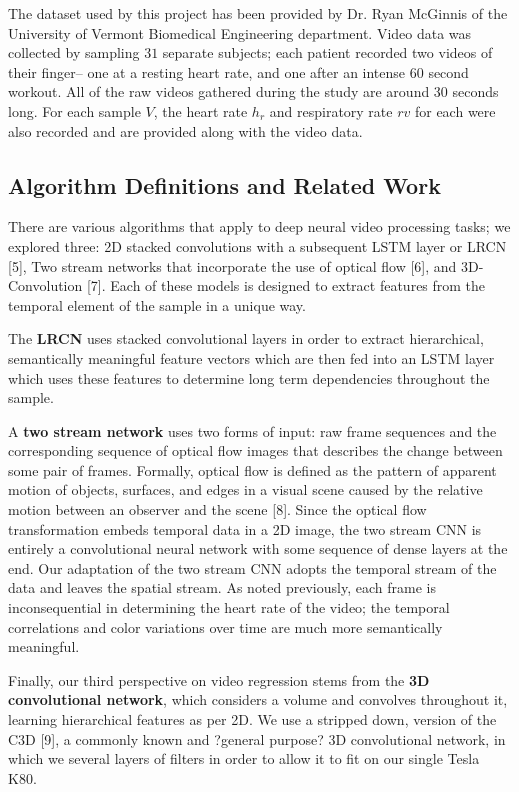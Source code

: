 \documentclass{article}
\begin{document}
\noindent The dataset used by this project has been provided by Dr. Ryan McGinnis of the University of Vermont Biomedical Engineering department. Video data was collected by sampling $31$ separate subjects; each patient recorded two videos of their finger-- one at a resting heart rate, and one after an intense $60$ second workout. All of the raw videos gathered during the study are around 30 seconds long. For each sample $V$, the heart rate $h_{r}$ and respiratory rate $r{v}$ for each were also recorded and are provided along with the video data.

\subsection[2.2]{Algorithm Definitions and Related Work}
\noindent There are various algorithms that apply to deep neural video processing tasks; we explored three: 2D stacked convolutions with a subsequent LSTM layer or LRCN [5], Two stream networks that incorporate the use of optical flow [6], and 3D-Convolution [7]. Each of these models is designed to extract features from the temporal element of the sample in a unique way.

\noindent The \textbf{LRCN} uses stacked convolutional layers in order to extract hierarchical, semantically meaningful feature vectors which are then fed into an LSTM layer which uses these features to determine long term dependencies throughout the sample. 

\noindent A \textbf{two stream network} uses two forms of input: raw frame sequences and the corresponding sequence of optical flow images that describes the change between some pair of frames. Formally, optical flow is defined as the pattern of apparent motion of objects, surfaces, and edges in a visual scene caused by the relative motion between an observer and the scene [8]. Since the optical flow transformation embeds temporal data in a 2D image, the two stream CNN is entirely a convolutional neural network with some sequence of dense layers at the end. Our adaptation of the two stream CNN adopts the temporal stream of the data and leaves the spatial stream. As noted previously, each frame is inconsequential in determining the heart rate of the video; the temporal correlations and color variations over time are much more semantically meaningful.

\noindent Finally, our third perspective on video regression stems from the \textbf{3D convolutional network}, which considers a volume and convolves throughout it, learning hierarchical features as per 2D. We use a stripped down, version of the C3D  [9], a commonly known and ?general purpose? 3D convolutional network, in which we several layers of filters in order to allow it to fit on our single Tesla K80.
\end{document}
